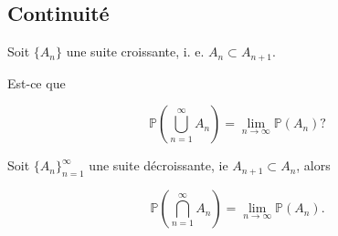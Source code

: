 \documentclass[french]{book}
\theoremstyle{definition}
\theoremstyle{remark}
\begin{document}
\subsection{Continuité}

Soit $\{ A_n \} $ une suite croissante, i. e. $A_n \subset A _{n+1}$.

Est-ce que

\begin{equation*}
  \mathbb{P}\left( \bigcup _{n=1} ^{\infty} A_n \right) = \lim_{n \to \infty} \mathbb{P}( A_n ) ?
\end{equation*}

Soit $\{ A_n \} _{n=1} ^{\infty} $ une suite décroissante, ie $A _{n+1} \subset A_n$, alors

\begin{equation*}
  \mathbb{P}\left( \bigcap _{n=1} ^{\infty}A_n \right) = \lim_{n \to \infty} \mathbb{P}( A_n ).
\end{equation*}
\end{document}
